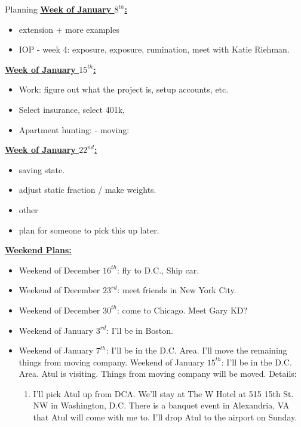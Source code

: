 \documentclass[serif, mathserif, final]{beamer}
\begin{document}
\begin{frame}
\begin{columns}
\begin{column}{0.5\textwidth}
\begin{block}{Planning}
\underline{{\bf Week of January $8^{th}$:}} 
\begin{itemize} 
\small \item \small extension + more examples
\item \small IOP - week 4: exposure, exposure, rumination,   meet with
  Katie Riehman.
\end{itemize} 

\underline{{\bf Week of January $15^{th}$:}}
\begin{itemize} 
\small \item \small Work: figure out what the project is, setup accounts, etc.
\item \small Select insurance, select 401k,
\item \small Apartment hunting: - moving:
\end{itemize}

\underline{{\bf Week of January $22^{nd}$:}} 
\begin{itemize}
\small \item \small saving state.
\item \small adjust static fraction / make weights.
\item \small other
\item \small plan for someone to pick this up later.
\end{itemize}

{\underline{\bf Weekend Plans:}} 
\begin{itemize}
\tiny \item \tiny Weekend of December $16^{th}$: fly to D.C., Ship
car.
\item \tiny Weekend of December $23^{rd}$: meet friends in New York City.
\item \tiny Weekend of December $30^{th}$: come to Chicago. Meet Gary KD?
\item \tiny Weekend of January $3^{rd}$: I'll be in Boston.
\item \tiny Weekend of January $7^{th}$: I'll be in the D.C. Area. I'll move the remaining things from moving company.
\tiny \tiny Weekend of January $15^{th}$: I'll be in the D.C. Area. Atul is
visiting. Things from moving company will be moved. Details: 

\begin{enumerate} 
\tiny \item \tiny I'll pick Atul up from DCA. We'll stay at The W Hotel at 515 15th
St. NW in Washington, D.C. There is a banquet event in Alexandria, VA
that Atul will come with me to. I'll drop Atul to the airport on
Sunday. 
\end{enumerate} 


\end{itemize}
\end{block}
\end{column}
\end{columns}
\end{frame}
\end{document}
